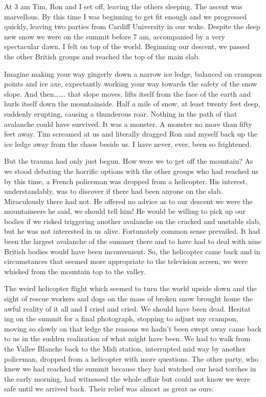 \documentclass[a5paper,openany,font 10pt]{scrbook}
\begin{document}
At 3 am Tim, Ron and I set off, leaving the others
sleeping. The ascent was marvellous. By this time I was beginning
to get fit enough and we progressed quickly, leaving two parties
from Cardiff University in our wake. Despite the deep new snow we
were on the summit before 7 am, accompanied by a very spectacular
dawn. I felt on top of the world. Beginning our descent, we
passed the other British groups and reached the top of the main
slab.

Imagine making your way gingerly down a narrow ice ledge,
balanced on crampon points and ice axe, expectantly working your
way towards the safety of the snow slope. And then\ldots{}\ldots{}. that
slope moves, lifts itself from the face of the earth and hurls
itself down the mountainside. Half a mile of snow, at least
twenty feet deep, suddenly erupting, causing a thunderous roar.
Nothing in the path of that avalanche could have survived. It was
a monster. A monster no more than fifty feet away. Tim screamed
at us and literally dragged Ron and myself back up the ice ledge
away from the chaos beside us. I have never, ever, been so
frightened.

But the trauma had only just begun. How were we to get off
the mountain? As we stood debating the horrific options with the
other groups who had reached us by this time, a French policeman
was dropped from a helicopter. His interest, understandably, was
to discover if there had been anyone on the slab. Miraculously
there had not. He offered no advice as to our descent   we were
the mountaineers he said, we should tell him! He would be willing
to pick up our bodies if we risked triggering another avalanche
on the cracked and unstable slab, but he was not interested in us
alive. Fortunately common sense prevailed. It had been the
largest avalanche of the summer there and to have had to deal
with nine British bodies would have been inconvenient. So, the
helicopter came back and in circumstances that seemed more
appropriate to the television screen, we were whisked from the
mountain top to the valley.

The weird helicopter flight which seemed to turn the world
upside down and the sight of rescue workers  and dogs on the mass
of broken snow brought home the awful reality of it all and I
cried and cried. We should have been dead. Hesitat ing on the
summit for a final photograph, stopping to adjust my crampon,
moving so slowly on that ledge   the reasons we hadn't been swept
away came back to us in the sudden realization of what might have
been. We had to walk from the Vallee Blanche back to the Midi
station, interrupted mid way by another policeman, dropped from a
helicopter with more questions. The other party, who knew we had
reached the summit because they had watched our head torches in
the early morning, had witnessed the whole affair but could not
know we were safe until we arrived back. Their relief was almost
as great as ours.
\end{document}
